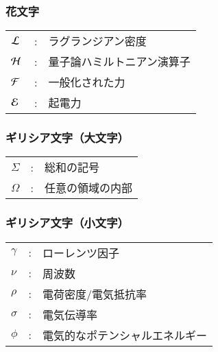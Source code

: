     \subsubsection*{花文字}
    \begin{tabular}{lll}
        $\mathcal{L}\,$                   &:  & ラグランジアン密度                                                    \\
        $\mathcal{H}\,$                   &:  & 量子論ハミルトニアン演算子                                            \\
        $\mathcal{F}$                 &:  & 一般化された力                                                        \\
        $\mathcal{E}$                 &:  & 起電力                                                                %
    \end{tabular}

    \subsubsection*{ギリシア文字（大文字）}
    \begin{tabular}{lll}
        $\Sigma$                &:  & 総和の記号                                                            \\
        $\Omega$                &:  & 任意の領域の内部                                 %
    \end{tabular}

    \subsubsection*{ギリシア文字（小文字）}
    \begin{tabular}{lll}
        $\gamma$                &:  & ローレンツ因子                                                        \\
        $\nu$                   &:  & 周波数                                                                \\
        $\rho$                  &:  & 電荷密度/電気抵抗率                                                   \\
        $\sigma$                &:  & 電気伝導率                                                            \\
        $\phi$                  &:  & 電気的なポテンシャルエネルギー                                        %
    \end{tabular}

